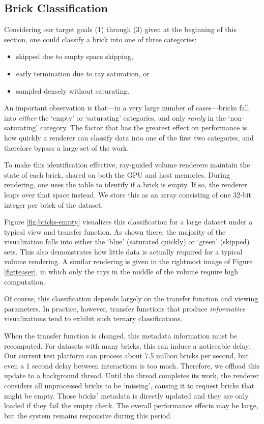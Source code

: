 \subsection{Brick Classification}
\label{sec:brick-classification}

Considering our target goals (1) through (3) given at the beginning of
this section, one could classify a brick into one of three categories:
\begin{itemize}
  \itemsep0em
  \item skipped due to empty space skipping,

  \item early termination due to ray saturation, or

  \item sampled densely without saturating.
\end{itemize}

An important observation is that---in a very large number of
cases---bricks fall into \emph{either} the `empty' or `saturating'
categories, and only \emph{rarely} in the `non-saturating' category.
The factor that has the greatest effect on performance is how quickly
a renderer can classify data into one of the first two categories, and
therefore bypass a large set of the work.

To make this identification effective, ray-guided volume renderers
maintain the state of each brick, shared on both the GPU and host
memories.  During rendering, one uses the table to identify if a brick
is empty.  If so, the renderer leaps over that space instead.  We store
this as an array consisting of one 32-bit integer per brick of the
dataset.

Figure \ref{fig:bricks-empty} visualizes this classification for a
large dataset under a typical view and transfer function.  As shown
there, the majority of the visualization falls into either the `blue'
(saturated quickly) or `green' (skipped) sets. This also demonstrates
how little data is actually required for a typical volume rendering.  A
similar rendering is given in the rightmost image of
Figure \ref{fig:teaser}, in which only the rays in the middle of the
volume require high computation.

Of course, this classification depends largely on the transfer function
and viewing parameters.  In practice, however, transfer functions that
produce \emph{informative} visualizations tend to exhibit such ternary
classifications.

When the transfer function is changed, this metadata information
must be recomputed.  For datasets with many bricks, this can induce
a noticeable delay.  Our current test platform can process about
7.5 million bricks per second, but even a 1 second delay between
interactions is too much.  Therefore, we offload this update to a
background thread.  Until the thread completes its work, the renderer
considers all unprocessed bricks to be `missing', causing it to request
bricks that might be empty.  Those bricks' metadata is directly
updated and they are only loaded if they fail the empty check.  The
overall performance effects may be large, but the system remains
responsive during this period.

